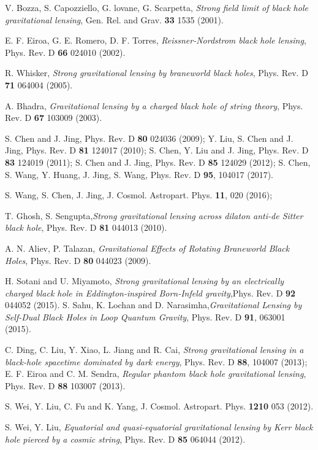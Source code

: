 \documentclass[aps,showpacs,preprintnumbers,amsmath,amssymb]{revtex4}
\begin{document}
\begin{thebibliography}{99}
V. Bozza, S. Capozziello, G. lovane, G.
Scarpetta, \textit{Strong field limit of black hole
gravitational lensing}, Gen. Rel. and Grav. {\bf 33}  1535 (2001).

E. F. Eiroa,  G. E. Romero, D. F. Torres, \textit{Reissner-Nordstrom black hole lensing}, Phys. Rev. D {\bf 66} 024010 (2002).

 R. Whisker, \textit{Strong gravitational lensing by braneworld black holes}, Phys. Rev. D {\bf71}  064004 (2005).

 A. Bhadra, \textit{Gravitational lensing by a charged black hole of string theory}, Phys. Rev. D {\bf 67}   103009 (2003).

 S. Chen and J. Jing, Phys. Rev. D {\bf 80}  024036 (2009); Y. Liu,  S. Chen and J. Jing, Phys. Rev. D {\bf81}  124017 (2010); S. Chen, Y. Liu  and J. Jing, Phys. Rev. D {\bf83} 124019 (2011); S. Chen and J. Jing, Phys. Rev. D {\bf85}  124029 (2012);  S. Chen, S. Wang, Y. Huang, J. Jing, S. Wang, Phys. Rev. D {\bf95}, 104017 (2017).
    
S. Wang, S. Chen, J. Jing, J. Cosmol. Astropart. Phys. {\bf11}, 020 (2016);

 T. Ghosh, S. Sengupta,\textit{Strong gravitational lensing across dilaton anti-de Sitter black hole}, Phys. Rev. D {\bf81} 044013 (2010).

 A. N. Aliev, P. Talazan, \textit{Gravitational Effects of Rotating Braneworld Black Holes}, Phys. Rev. D {\bf80}  044023 (2009).

H. Sotani and U. Miyamoto, \textit{Strong gravitational lensing by an electrically charged black hole in Eddington-inspired Born-Infeld gravity},Phys. Rev. D {\bf92}  044052 (2015).
S. Sahu, K. Lochan and D. Narasimha,\textit{Gravitational Lensing by Self-Dual Black Holes in Loop Quantum Gravity}, Phys. Rev. D {\bf91}, 063001 (2015).


 C. Ding, C. Liu, Y. Xiao, L. Jiang and R. Cai,
 \textit{Strong gravitational lensing in a black-hole
spacetime dominated by dark energy}, Phys. Rev. D {\bf88}, 104007 (2013); E. F. Eiroa and C. M. Sendra, \textit{Regular phantom black hole gravitational lensing}, Phys. Rev. D {\bf88}  103007 (2013).

 S. Wei, Y. Liu, C. Fu and K. Yang, J. Cosmol. Astropart. Phys. {\bf1210} 053 (2012).

 S. Wei, Y. Liu, \textit{Equatorial and quasi-equatorial gravitational lensing by Kerr black hole pierced by a cosmic string}, Phys. Rev. D {\bf85} 064044 (2012).



\end{thebibliography}
\end{document}
